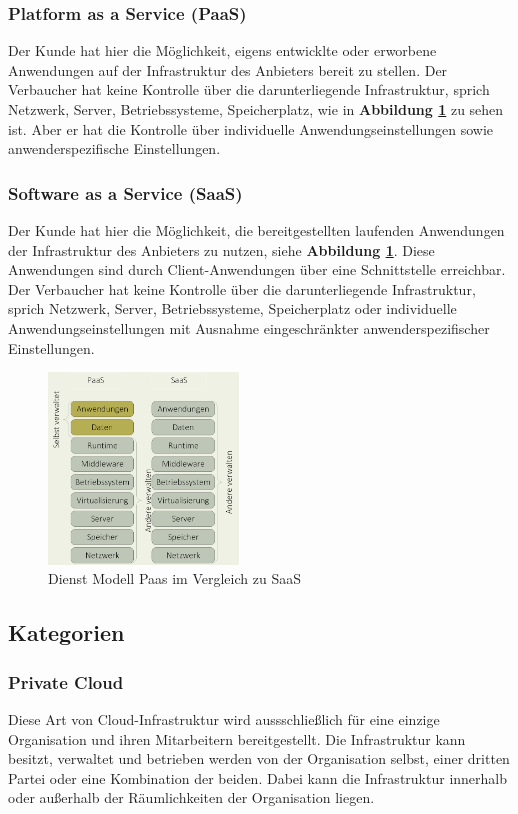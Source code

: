 \subsubsection{Platform as a Service (PaaS)} 
Der Kunde hat hier die Möglichkeit, eigens entwicklte oder erworbene Anwendungen auf der Infrastruktur des Anbieters bereit zu stellen. Der Verbaucher hat keine Kontrolle über die darunterliegende Infrastruktur, sprich Netzwerk, Server, Betriebssysteme, Speicherplatz, wie in \textbf{Abbildung \ref{fig:saas}} zu sehen ist. Aber er hat die Kontrolle über individuelle Anwendungseinstellungen sowie anwenderspezifische Einstellungen\cite{nist_definition}.

\subsubsection{Software as a Service (SaaS)} 
Der Kunde hat hier die Möglichkeit, die bereitgestellten laufenden Anwendungen der Infrastruktur des Anbieters zu nutzen, siehe \textbf{Abbildung \ref{fig:saas}}. Diese Anwendungen sind durch Client-Anwendungen über eine Schnittstelle erreichbar. Der Verbaucher hat keine Kontrolle über die darunterliegende Infrastruktur, sprich Netzwerk, Server, Betriebssysteme, Speicherplatz oder individuelle Anwendungseinstellungen mit Ausnahme eingeschränkter anwenderspezifischer Einstellungen\cite{nist_definition}.

\begin{figure}[H]
	\centering
	\includegraphics[width=0.45\textwidth]{Images/SaaS}
	\caption{Dienst Modell Paas im Vergleich zu SaaS}
	\label{fig:saas}
\end{figure}

\subsection{Kategorien}
\subsubsection{Private Cloud}
Diese Art von Cloud-Infrastruktur wird aussschließlich für eine einzige Organisation und ihren Mitarbeitern bereitgestellt. Die Infrastruktur kann besitzt, verwaltet und betrieben werden von der Organisation selbst, einer dritten Partei oder eine Kombination der beiden. Dabei kann die Infrastruktur innerhalb oder außerhalb der Räumlichkeiten der Organisation liegen\cite{nist_definition}.

